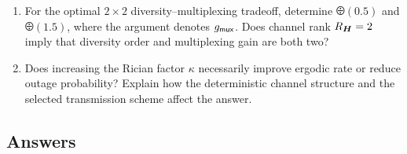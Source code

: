 \begin{enumerate}[label=\textbf{E\arabic*.}]
	\item For the optimal $2\times2$ diversity--multiplexing tradeoff, determine $\odiv(0.5)$ and $\odiv(1.5)$, where the argument denotes $g_{\mathsf{mux}}$. Does channel rank $R_{\bm{H}}=2$ imply that diversity order and multiplexing gain are both two?
	
	\item Does increasing the Rician factor $\kappa$ necessarily improve ergodic rate or reduce outage probability? Explain how the deterministic channel structure and the selected transmission scheme affect the answer.
	
\end{enumerate}


\clearpage
\subsection*{Answers}


